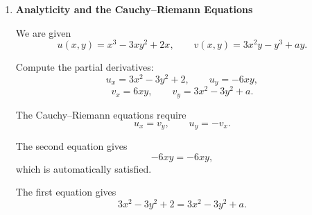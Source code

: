 \begin{enumerate}
    Substitute into the mapping:
    \[
        w=\frac{1}{x+2i-i}
        =
        \frac{1}{x+i}.
    \]

    Rationalize:
    \[
        w=\frac{1}{x+i}\cdot \frac{x-i}{x-i}
        =
        \frac{x-i}{x^2+1}.
    \]

    Write
    \[
        w=u+iv.
    \]
    Then
    \[
        u=\frac{x}{x^2+1},
        \qquad
        v=-\frac{1}{x^2+1}.
    \]

    We eliminate $x$. Divide $u$ by $v$:
    \[
        \frac{u}{v}
        =
        \frac{x/(x^2+1)}{-1/(x^2+1)}
        =
        -x.
    \]
    Hence,
    \[
        x=-\frac{u}{v}.
    \]

    Since
    \[
        v=-\frac{1}{x^2+1},
    \]
    substitute $x=-u/v$:
    \[
        v=-\frac{1}{(u^2/v^2)+1}.
    \]

    Simplify:
    \[
        v=-\frac{v^2}{u^2+v^2}.
    \]

    Since $v\neq 0$ on the image curve, divide by $v$:
    \[
        1=-\frac{v}{u^2+v^2}.
    \]

    Therefore,
    \[
        u^2+v^2=-v.
    \]

    Rearranging:
    \[
        u^2+v^2+v=0.
    \]

    Complete the square:
    \[
        u^2+\left(v+\frac12\right)^2=\frac14.
    \]

    Hence, the image is the circle
    \[
        u^2+\left(v+\frac12\right)^2=\left(\frac12\right)^2.
    \]

    This is a circle of radius $1/2$ centered at
    \[
        0-\frac12 i.
    \]

    \item \textbf{Analyticity and the Cauchy--Riemann Equations}

    We are given
    \[
        u(x,y)=x^3-3xy^2+2x,
        \qquad
        v(x,y)=3x^2y-y^3+ay.
    \]

    Compute the partial derivatives:
    \[
        u_x=3x^2-3y^2+2,
        \qquad
        u_y=-6xy,
    \]
    \[
        v_x=6xy,
        \qquad
        v_y=3x^2-3y^2+a.
    \]

    The Cauchy--Riemann equations require
    \[
        u_x=v_y,
        \qquad
        u_y=-v_x.
    \]

    The second equation gives
    \[
        -6xy=-6xy,
    \]
    which is automatically satisfied.

    The first equation gives
    \[
        3x^2-3y^2+2=3x^2-3y^2+a.
    \]


\end{enumerate}
